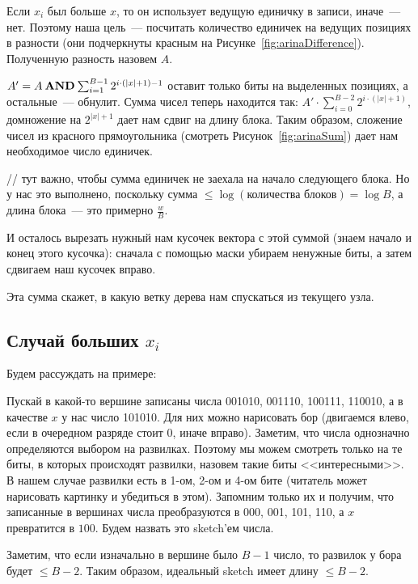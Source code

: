 	

Если $x_i$ был больше $x$, то он использует ведущую единичку в записи, иначе~--- нет. Поэтому наша цель~--- посчитать количество единичек на ведущих позициях в разности (они подчеркнуты красным на Рисунке~\ref{fig:arinaDifference}). Полученную разность назовем $A$.

$A' = A \mathbin{\operatorname{\mathbf{AND}}} \sum_{i=1}^{B-1} 2^{i\cdot(|x|+1)-1}$ оставит только биты на выделенных позициях, а остальные~--- обнулит. Сумма чисел теперь находится так: $A' \cdot \sum_{i=0}^{B-2} 2^{i\cdot(|x|+1)}$, домножение на $2^{|x|+1}$ дает нам сдвиг на длину блока. Таким образом, сложение чисел из красного прямоугольника (смотреть Рисунок~\ref{fig:arinaSum}) дает нам необходимое число единичек.

	

// тут важно, чтобы сумма единичек не заехала на начало следующего блока. Но у нас это выполнено, поскольку сумма $\leqslant \log(\text{количества блоков}) = \log B$, а длина блока~--- это примерно $\frac{w}{B}$.

И осталось вырезать нужный нам кусочек вектора с этой суммой (знаем начало и конец этого кусочка): сначала с помощью маски убираем ненужные биты, а затем сдвигаем наш кусочек вправо.

Эта сумма скажет, в какую ветку дерева нам спускаться из текущего узла.

\bigskip

\subsection{Случай больших $x_i$}

Будем рассуждать на примере:

Пускай в какой-то вершине записаны числа 001010, 001110, 100111, 110010, а в качестве $x$ у нас число 101010. Для них можно нарисовать бор (двигаемся влево, если в очередном разряде стоит $0$, иначе вправо). Заметим, что числа однозначно определяются выбором на развилках. Поэтому мы можем смотреть только на те биты, в которых происходят развилки, назовем такие биты <<интересными>>. В нашем случае развилки есть в 1-ом, 2-ом и 4-ом бите (читатель может нарисовать картинку и убедиться в этом). Запомним только их и получим, что записанные в вершинах числа преобразуются в 000, 001, 101, 110, а $x$ превратится в $100$. Будем назвать это sketch'ем числа.

Заметим, что если изначально в вершине было $B-1$ число, то развилок у бора будет $\leqslant B-2$. Таким образом, идеальный sketch имеет длину $\leqslant B-2$.

